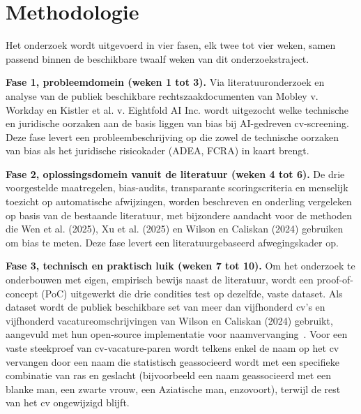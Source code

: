 \documentclass{hogent-article}
\begin{document}
\section{Methodologie}%
\label{sec:methodologie}

Het onderzoek wordt uitgevoerd in vier fasen, elk twee tot vier weken,
samen passend binnen de beschikbare twaalf weken van dit onderzoekstraject.

\textbf{Fase 1, probleemdomein (weken 1 tot 3).} Via literatuuronderzoek en
analyse van de publiek beschikbare rechtszaakdocumenten van Mobley
v. Workday en Kistler et al. v. Eightfold AI Inc. wordt uitgezocht welke
technische en juridische oorzaken aan de basis liggen van bias bij
AI-gedreven cv-screening. Deze fase levert een probleembeschrijving op die
zowel de technische oorzaken van bias als het juridische risicokader
(ADEA, FCRA) in kaart brengt.

\textbf{Fase 2, oplossingsdomein vanuit de literatuur (weken 4 tot 6).} De
drie voorgestelde maatregelen, bias-audits, transparante scoringscriteria
en menselijk toezicht op automatische afwijzingen, worden beschreven en
onderling vergeleken op basis van de bestaande literatuur, met bijzondere
aandacht voor de methoden die Wen et al. (2025), Xu et al. (2025) en Wilson
en Caliskan (2024) gebruiken om bias te meten. Deze fase levert een
literatuurgebaseerd afwegingskader op.

\textbf{Fase 3, technisch en praktisch luik (weken 7 tot 10).} Om het
onderzoek te onderbouwen met eigen, empirisch bewijs naast de literatuur,
wordt een proof-of-concept (PoC) uitgewerkt die drie condities test op
dezelfde, vaste dataset. Als dataset wordt de publiek beschikbare set van
meer dan vijfhonderd cv's en vijfhonderd vacatureomschrijvingen van Wilson
en Caliskan (2024) gebruikt, aangevuld met hun open-source implementatie
voor naamvervanging~\autocite{Wilson2024}. Voor een vaste steekproef van
cv-vacature-paren wordt telkens enkel de naam op het cv vervangen door een
naam die statistisch geassocieerd wordt met een specifieke combinatie van
ras en geslacht (bijvoorbeeld een naam geassocieerd met een blanke man, een
zwarte vrouw, een Aziatische man, enzovoort), terwijl de rest van het cv
ongewijzigd blijft.
\end{document}
